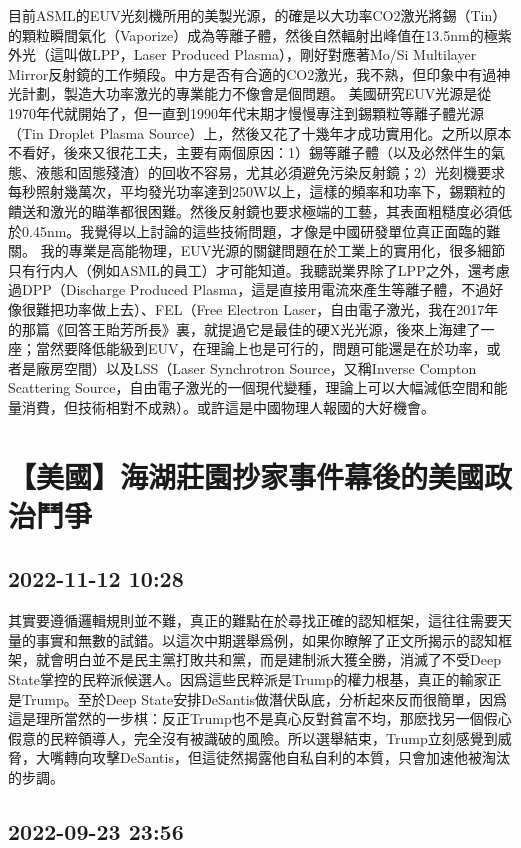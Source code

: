 \documentclass[twocolumn]{ctexart}
\begin{document}
目前ASML的EUV光刻機所用的美製光源，的確是以大功率CO2激光將錫（Tin）的顆粒瞬間氣化（Vaporize）成為等離子體，然後自然輻射出峰值在13.5nm的極紫外光（這叫做LPP，Laser Produced Plasma），剛好對應著Mo/Si Multilayer Mirror反射鏡的工作頻段。中方是否有合適的CO2激光，我不熟，但印象中有過神光計劃，製造大功率激光的專業能力不像會是個問題。
美國研究EUV光源是從1970年代就開始了，但一直到1990年代末期才慢慢專注到錫顆粒等離子體光源（Tin Droplet Plasma Source）上，然後又花了十幾年才成功實用化。之所以原本不看好，後來又很花工夫，主要有兩個原因：1）錫等離子體（以及必然伴生的氣態、液態和固態殘渣）的回收不容易，尤其必須避免污染反射鏡；2）光刻機要求每秒照射幾萬次，平均發光功率達到250W以上，這樣的頻率和功率下，錫顆粒的饋送和激光的瞄準都很困難。然後反射鏡也要求極端的工藝，其表面粗糙度必須低於0.45nm。我覺得以上討論的這些技術問題，才像是中國研發單位真正面臨的難關。
我的專業是高能物理，EUV光源的關鍵問題在於工業上的實用化，很多細節只有行内人（例如ASML的員工）才可能知道。我聽説業界除了LPP之外，還考慮過DPP（Discharge Produced Plasma，這是直接用電流來產生等離子體，不過好像很難把功率做上去）、FEL（Free Electron Laser，自由電子激光，我在2017年的那篇《回答王貽芳所長》裏，就提過它是最佳的硬X光光源，後來上海建了一座；當然要降低能級到EUV，在理論上也是可行的，問題可能還是在於功率，或者是廠房空間）以及LSS（Laser Synchrotron Source，又稱Inverse Compton Scattering Source，自由電子激光的一個現代變種，理論上可以大幅減低空間和能量消費，但技術相對不成熟）。或許這是中國物理人報國的大好機會。
\section*{【美國】海湖莊園抄家事件幕後的美國政治鬥爭}
\subsection*{2022-11-12 10:28}

其實要遵循邏輯規則並不難，真正的難點在於尋找正確的認知框架，這往往需要天量的事實和無數的試錯。以這次中期選舉爲例，如果你瞭解了正文所揭示的認知框架，就會明白並不是民主黨打敗共和黨，而是建制派大獲全勝，消滅了不受Deep State掌控的民粹派候選人。因爲這些民粹派是Trump的權力根基，真正的輸家正是Trump。至於Deep State安排DeSantis做潛伏臥底，分析起來反而很簡單，因爲這是理所當然的一步棋：反正Trump也不是真心反對貧富不均，那麽找另一個假心假意的民粹領導人，完全沒有被識破的風險。所以選舉結束，Trump立刻感覺到威脅，大嘴轉向攻擊DeSantis，但這徒然揭露他自私自利的本質，只會加速他被淘汰的步調。
\subsection*{2022-09-23 23:56}
\end{document}
